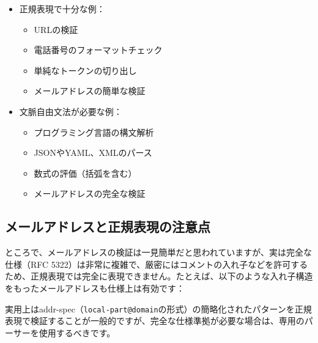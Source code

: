 \begin{itemize}
\tightlist
\item
  正規表現で十分な例：

  \begin{itemize}
  \tightlist
  \item
    URLの検証
  \item
    電話番号のフォーマットチェック
  \item
    単純なトークンの切り出し
  \item
    メールアドレスの簡単な検証
  \end{itemize}
\item
  文脈自由文法が必要な例：

  \begin{itemize}
  \tightlist
  \item
    プログラミング言語の構文解析
  \item
    JSONやYAML、XMLのパース
  \item
    数式の評価（括弧を含む）
  \item
    メールアドレスの完全な検証
  \end{itemize}
\end{itemize}

\hypertarget{chapter4-ux30e1ux30fcux30ebux30a2ux30c9ux30ecux30b9ux3068ux6b63ux898fux8868ux73feux306eux6ce8ux610fux70b9}{%
\subsection{メールアドレスと正規表現の注意点}\label{chapter4-ux30e1ux30fcux30ebux30a2ux30c9ux30ecux30b9ux3068ux6b63ux898fux8868ux73feux306eux6ce8ux610fux70b9}}

ところで、メールアドレスの検証は一見簡単だと思われていますが、実は完全な仕様（RFC
5322）は非常に複雑で、厳密にはコメントの入れ子などを許可するため、正規表現では完全に表現できません。たとえば、以下のような入れ子構造をもったメールアドレスも仕様上は有効です：

\begin{Shaded}
\begin{Highlighting}[]
\end{Highlighting}
\end{Shaded}

実用上はaddr-spec（\texttt{local-part@domain}の形式）の簡略化されたパターンを正規表現で検証することが一般的ですが、完全な仕様準拠が必要な場合は、専用のパーサーを使用するべきです。

